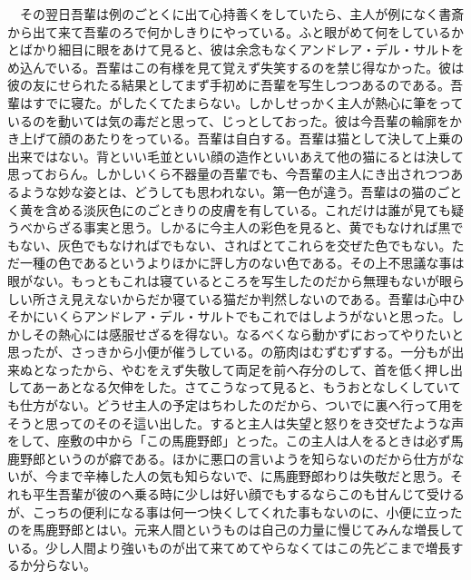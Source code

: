 \documentclass[a5j]{ltjbook}
\begin{document}
　その翌日吾輩は例のごとくに出て心持善くをしていたら、主人が例になく書斎から出て来て吾輩のろで何かしきりにやっている。ふと眼がめて何をしているかとばかり細目に眼をあけて見ると、彼は余念もなくアンドレア・デル・サルトをめ込んでいる。吾輩はこの有様を見て覚えず失笑するのを禁じ得なかった。彼は彼の友にせられたる結果としてまず手初めに吾輩を写生しつつあるのである。吾輩はすでに寝た。がしたくてたまらない。しかしせっかく主人が熱心に筆をっているのを動いては気の毒だと思って、じっとしておった。彼は今吾輩の輪廓をかき上げて顔のあたりをっている。吾輩は自白する。吾輩は猫として決して上乗の出来ではない。背といい毛並といい顔の造作といいあえて他の猫にるとは決して思っておらん。しかしいくら不器量の吾輩でも、今吾輩の主人にき出されつつあるような妙な姿とは、どうしても思われない。第一色が違う。吾輩はの猫のごとく黄を含める淡灰色にのごときりの皮膚を有している。これだけは誰が見ても疑うべからざる事実と思う。しかるに今主人の彩色を見ると、黄でもなければ黒でもない、灰色でもなければでもない、さればとてこれらを交ぜた色でもない。ただ一種の色であるというよりほかに評し方のない色である。その上不思議な事は眼がない。もっともこれは寝ているところを写生したのだから無理もないが眼らしい所さえ見えないからだか寝ている猫だか判然しないのである。吾輩は心中ひそかにいくらアンドレア・デル・サルトでもこれではしようがないと思った。しかしその熱心には感服せざるを得ない。なるべくなら動かずにおってやりたいと思ったが、さっきから小便が催うしている。の筋肉はむずむずする。一分もが出来ぬとなったから、やむをえず失敬して両足を前へ存分のして、首を低く押し出してあーあとなる欠伸をした。さてこうなって見ると、もうおとなしくしていても仕方がない。どうせ主人の予定はちわしたのだから、ついでに裏へ行って用をそうと思ってのそのそ這い出した。すると主人は失望と怒りをき交ぜたような声をして、座敷の中から「この馬鹿野郎」とった。この主人は人をるときは必ず馬鹿野郎というのが癖である。ほかに悪口の言いようを知らないのだから仕方がないが、今まで辛棒した人の気も知らないで、に馬鹿野郎わりは失敬だと思う。それも平生吾輩が彼のへ乗る時に少しは好い顔でもするならこのも甘んじて受けるが、こっちの便利になる事は何一つ快くしてくれた事もないのに、小便に立ったのを馬鹿野郎とはい。元来人間というものは自己の力量に慢じてみんな増長している。少し人間より強いものが出て来てめてやらなくてはこの先どこまで増長するか分らない。 \newline
\end{document}
